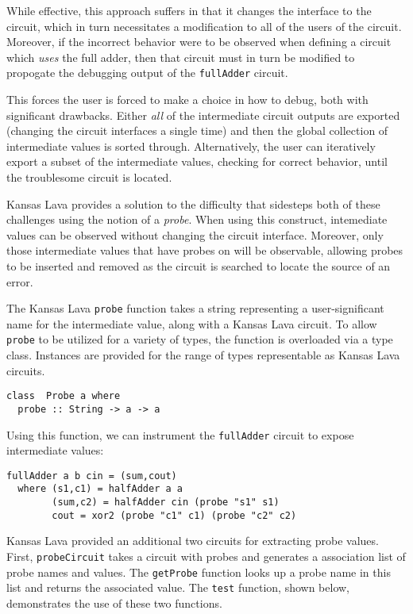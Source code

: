 \documentclass{llncs}
\begin{document}
While effective, this approach suffers in that it changes the interface to the
circuit, which in turn necessitates a modification to all of the users of the
circuit. Moreover, if the incorrect behavior were to be observed when defining a
circuit which \emph{uses} the full adder, then that circuit must in turn be
modified to propogate the debugging output of the \verb!fullAdder!  circuit.

This forces the user is forced to make a choice in how to debug, both with
significant drawbacks. Either \emph{all} of the intermediate circuit outputs are
exported (changing the circuit interfaces a single time) and then the global
collection of intermediate values is sorted through. Alternatively, the user can
iteratively export a subset of the intermediate values, checking for correct
behavior, until the troublesome circuit is located.

Kansas Lava provides a solution to the difficulty that sidesteps both of these
challenges using the notion of a \emph{probe}. When using this construct,
intemediate values can be observed without changing the circuit
interface. Moreover, only those intermediate values that have probes on will be
observable, allowing probes to be inserted and removed as the circuit is
searched to locate the source of an error.

The Kansas Lava \verb!probe! function takes a string representing a
user-significant name for the intermediate value, along with a Kansas Lava
circuit. To allow \verb!probe! to be utilized for a variety of types, the
function is overloaded via a type class. Instances are provided for the range of
types representable as Kansas Lava circuits.

\begin{verbatim}
class  Probe a where
  probe :: String -> a -> a
\end{verbatim}

Using this function, we can instrument the \verb!fullAdder! circuit to expose
intermediate values:

\begin{verbatim}
fullAdder a b cin = (sum,cout)
  where (s1,c1) = halfAdder a a
        (sum,c2) = halfAdder cin (probe "s1" s1)
        cout = xor2 (probe "c1" c1) (probe "c2" c2)
\end{verbatim}

Kansas Lava provided an additional two circuits for extracting probe
values. First, \verb!probeCircuit! takes a circuit with probes and generates a
association list of probe names and values. The \verb!getProbe! function looks
up a probe name in this list and returns the associated value. The \verb!test!
function, shown below, demonstrates the use of these two functions.
\end{document}
